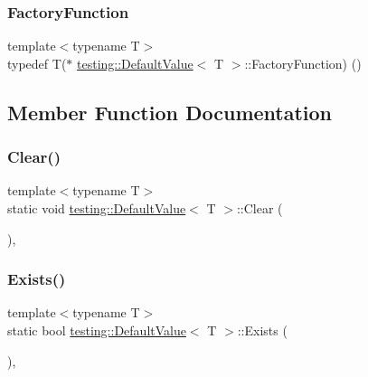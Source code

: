 \subsubsection{\texorpdfstring{Factory\+Function}{FactoryFunction}}
{\footnotesize\ttfamily template$<$typename T$>$ \\
typedef T($\ast$ \hyperlink{classtesting_1_1_default_value}{testing\+::\+Default\+Value}$<$ T $>$\+::Factory\+Function) ()}



\subsection{Member Function Documentation}
\mbox{\label{classtesting_1_1_default_value_a8163037b60311177cb211f070c512ee3}} 
\subsubsection{\texorpdfstring{Clear()}{Clear()}}
{\footnotesize\ttfamily template$<$typename T$>$ \\
static void \hyperlink{classtesting_1_1_default_value}{testing\+::\+Default\+Value}$<$ T $>$\+::Clear (\begin{DoxyParamCaption}{ }\end{DoxyParamCaption})\hspace{0.3cm}{\ttfamily [inline]}, {\ttfamily [static]}}

\mbox{\label{classtesting_1_1_default_value_aec1ff9b510af7dbb86c837fd2409fd70}} 
\subsubsection{\texorpdfstring{Exists()}{Exists()}}
{\footnotesize\ttfamily template$<$typename T$>$ \\
static bool \hyperlink{classtesting_1_1_default_value}{testing\+::\+Default\+Value}$<$ T $>$\+::Exists (\begin{DoxyParamCaption}{ }\end{DoxyParamCaption})\hspace{0.3cm}{\ttfamily [inline]}, {\ttfamily [static]}}

